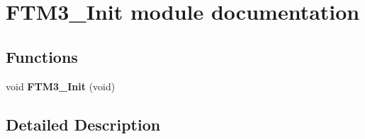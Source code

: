 \hypertarget{group___f_t_m3___init__module}{}\section{F\+T\+M3\+\_\+\+Init module documentation}
\label{group___f_t_m3___init__module}
\subsection*{Functions}
\begin{DoxyCompactItemize}
\item 
void {\bfseries F\+T\+M3\+\_\+\+Init} (void)\hypertarget{group___f_t_m3___init__module_ga4c9047573a0e3a70479fad31b7114c95}{}\label{group___f_t_m3___init__module_ga4c9047573a0e3a70479fad31b7114c95}

\end{DoxyCompactItemize}


\subsection{Detailed Description}
